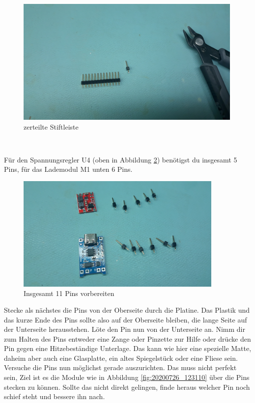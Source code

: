 \documentclass[12pt, a4paper]{article}		%
\begin{document}
\begin{minipage}[t]{0.49\textwidth}
\begin{figure}[H]
	\centering
		\includegraphics[width=0.99\textwidth]{Grafiken/20200726_121920.jpg}
	\caption{zerteilte Stiftleiste}
	\label{fig:20200726_121920}
\end{figure}
\end{minipage}
\\ \newline

Für den Spannungsregler U4 (oben in Abbildung \ref{fig:20200726_122303}) benötigst du insgesamt 5 Pins, für das Lademodul M1 unten 6 Pins.

\begin{figure}[H]
	\centering
		\includegraphics[width=0.90\textwidth]{Grafiken/20200726_122303.jpg}
	\caption{Insgesamt 11 Pins vorbereiten}
	\label{fig:20200726_122303}
\end{figure}

Stecke als nächstes die Pins von der Oberseite durch die Platine. Das Plastik und das kurze Ende des Pins sollte also auf der Oberseite bleiben, die lange Seite auf der Unterseite herausstehen. Löte den Pin nun von der Unterseite an. Nimm dir zum Halten des Pins entweder eine Zange oder Pinzette zur Hilfe oder drücke den Pin gegen eine Hitzebeständige Unterlage. Das kann wie hier eine spezielle Matte, daheim aber auch eine Glasplatte, ein altes Spiegelstück oder eine Fliese sein. Versuche die Pins nun möglichst gerade auszurichten. Das muss nicht perfekt sein, Ziel ist es die Module wie in Abbildung \ref{fig:20200726_123110} über die Pins stecken zu können. Sollte das nicht direkt gelingen, finde heraus welcher Pin noch schief steht und bessere ihn nach.\\ \newline
\end{document}

